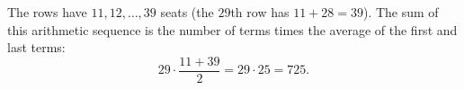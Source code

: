 The rows have $11,12,\dots,39$ seats (the $29$th row has $11+28=39$). The sum of this arithmetic sequence is the number of terms times the average of the first and last terms:
\[29\cdot\dfrac{11+39}{2}=29\cdot25=\boxed{725}.\]
